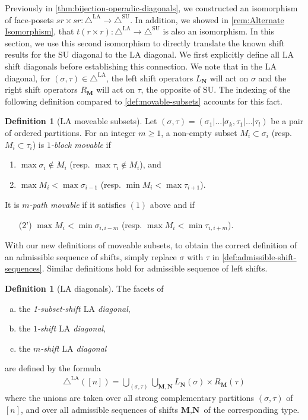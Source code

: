 \documentclass{amsart}
\theoremstyle{definition}
\newtheorem{definition}[theorem]{Definition}
\newcommand{\SU}{\mathrm{SU}}
\newcommand{\LA}{\mathrm{LA}}
\newcommand{\SUD}{\triangle^{\mathrm{SU}}}
\newcommand{\LAD}{\triangle^{\mathrm{LA}}}
\begin{document}
Previously in \cref{thm:bijection-operadic-diagonals}, we constructed an isomorphism of face-posets $sr\times sr:\LAD\to\SUD$.
In addition, we showed in \cref{rem:Alternate Isomorphism}, that $t(r\times r):\LAD\to\SUD$ is also an isomorphism.
In this section, we use this second isomorphism to directly translate the known shift results for the $\SU$ diagonal to the $\LA$ diagonal. 
We first explicitly define all $\LA$ shift diagonals before establishing this connection.
We note that in the $\LA$ diagonal, for $(\sigma,\tau)\in \LAD$, the left shift operators $L_\mathbf{N}$ will act on $\sigma$ and the right shift operators $R_\mathbf{M}$ will act on $\tau$, the opposite of $\SU$.
The indexing of the following definition compared to \cref{def:movable-subsets} accounts for this fact.

\begin{definition}[$\LA$ moveable subsets]
\label{def:LAD movable-subsets}
Let $(\sigma,\tau) = (\sigma_1|\dots|\sigma_k,\tau_1|\dots|\tau_l)$ be a pair of ordered partitions.
For an integer $m\geq 1$, a non-empty subset $M_i \subset \sigma_i$ (resp. $M_{i}\subset \tau_{i}$) is \emph{$1$-block movable} if 
\begin{enumerate}
    \item $\max \sigma_i \notin M_i$ (resp. $\max \tau_{i} \notin M_i$), and
    \item $\max M_i < \max \sigma_{i-1}$ (resp. $\min M_{i} < \max \tau_{i+1}$).
\end{enumerate}
It is \emph{$m$-path movable} if it satisfies $(1)$ above and if
\begin{enumerate}
    \item[(2')] $\max M_i < \min \sigma_{i,i-m}$ (resp. $\max M_{i} < \min \tau_{i,i+m}$).
\end{enumerate}
\end{definition}
With our new definitions of moveable subsets, to obtain the correct definition of an admissible sequence of shifts, simply replace $\sigma$ with $\tau$ in \cref{def:admissible-shift-sequences}. 
Similar definitions hold for admissible sequence of left shifts.

\begin{definition}[$\LA$ diagonals]
    \label{def:shift-LA}
   The facets of 
   \begin{enumerate}[(a)]
    \item the \emph{1-subset-shift $\LA$ diagonal},
    \item the \emph{$1$-shift $\LA$ diagonal},
    \item the \emph{$m$-shift $\LA$ diagonal}
   \end{enumerate}
   are defined by the formula
    \begin{align*}
        \LAD([n]) = \bigcup_{(\sigma,\tau)} \bigcup_{\mathbf{M}, \mathbf{N}} L_\mathbf{N}(\sigma)\times R_\mathbf{M}(\tau)
    \end{align*}
    where the unions are taken over all strong complementary partitions $(\sigma, \tau)$ of $[n]$, and over all admissible sequences of shifts $\textbf{M},\textbf{N}$ of the corresponding type.
\end{definition}
\end{document}
